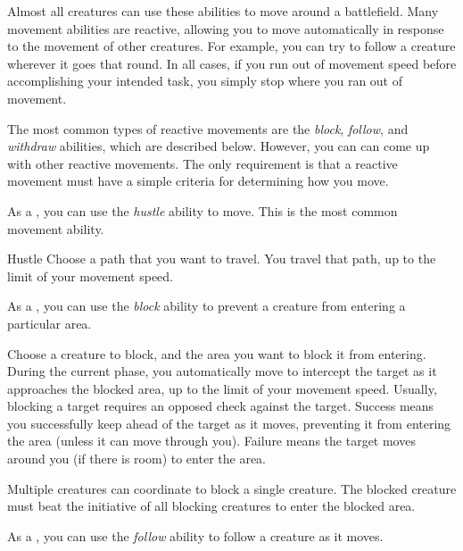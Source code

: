         Almost all creatures can use these abilities to move around a battlefield.
        Many movement abilities are reactive, allowing you to move automatically in response to the movement of other creatures.
        For example, you can try to follow a creature wherever it goes that round.
        In all cases, if you run out of movement speed before accomplishing your intended task, you simply stop where you ran out of movement.

        The most common types of reactive movements are the \textit{block}, \textit{follow}, and \textit{withdraw} abilities, which are described below.
        However, you can can come up with other reactive movements.
        The only requirement is that a reactive movement must have a simple criteria for determining how you move.

         As a , you can use the \textit{hustle} ability to move.
        This is the most common movement ability.

        \begin{freeability}{Hustle}
            Choose a path that you want to travel. You travel that path, up to the limit of your movement speed.
        \end{freeability}

         As a , you can use the \textit{block} ability to prevent a creature from entering a particular area.

        \begin{freeability}{}
            Choose a creature to block, and the area you want to block it from entering.
            During the current phase, you automatically move to intercept the target as it approaches the blocked area, up to the limit of your movement speed.
            Usually, blocking a target requires an opposed  check against the target.
            Success means you successfully keep ahead of the target as it moves, preventing it from entering the area (unless it can move through you).
            Failure means the target moves around you (if there is room) to enter the area.

            Multiple creatures can coordinate to block a single creature.
            The blocked creature must beat the initiative of all blocking creatures to enter the blocked area.
        \end{freeability}

         As a , you can use the \textit{follow} ability to follow a creature as it moves.

